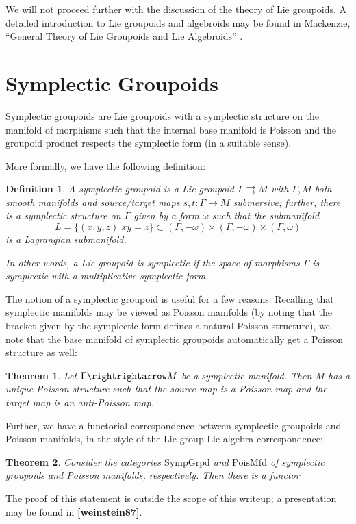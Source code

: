 \documentclass{tufte-handout}
\newtheorem{thrm}{Theorem}
\newtheorem{defn}{Definition}
\begin{document}
We will not proceed further with the discussion of the theory of Lie groupoids. A detailed introduction to Lie groupoids and algebroids may be found in Mackenzie, ``General Theory of Lie Groupoids and Lie Algebroids'' \cite{mackenzie}.

\section{Symplectic Groupoids}
Symplectic groupoids are Lie groupoids with a symplectic structure on the manifold of morphisms such that the internal base manifold is Poisson and the groupoid product respects the symplectic form (in a suitable sense).

More formally, we have the following definition:
\begin{defn}
A \emph{symplectic groupoid} is a Lie groupoid $\Gamma \rightrightarrows M$ with $\Gamma, M$ both smooth manifolds and source/target maps $s,t: \Gamma \to M$ submersive; further, there is a symplectic structure on $\Gamma$ given by a form $\omega$ such that the submanifold
$$
L = \{(x,y,z) | xy = z \} \subset (\Gamma,-\omega) \times (\Gamma,-\omega) \times (\Gamma,\omega)
$$
is a Lagrangian submanifold.

In other words, a Lie groupoid is \emph{symplectic} if the space of morphisms $\Gamma$ is symplectic with a multiplicative symplectic form.
\end{defn} %

The notion of a symplectic groupoid is useful for a few reasons. Recalling that symplectic manifolds may be viewed as Poisson manifolds (by noting that the bracket given by the symplectic form defines a natural Poisson structure), we note that the base manifold of symplectic groupoids automatically get a Poisson structure as well:
\begin{thrm}
Let $\Gamma \rightrightarrow M$ be a symplectic manifold. Then $M$ has a unique Poisson structure such that the source map is a Poisson map and the target map is an anti-Poisson map.
\end{thrm}

Further, we have a functorial correspondence between symplectic groupoids and Poisson manifolds, in the style of the Lie group-Lie algebra correspondence:
\begin{thrm}
Consider the categories $\mathrm{SympGrpd}$ and $\mathrm{PoisMfd}$ of symplectic groupoids and Poisson manifolds, respectively. Then there is a functor


\end{thrm}
The proof of this statement is outside the scope of this writeup; a presentation may be found in \textbf{[weinstein87]}.
\end{document}
